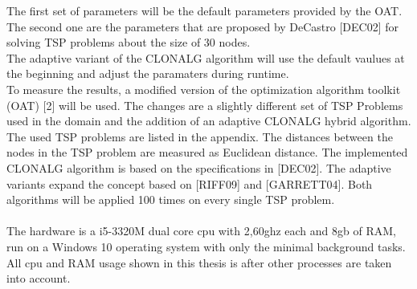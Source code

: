 The first set of parameters will be the default parameters provided by the OAT. The second one are the parameters that are proposed by DeCastro [DEC02] for solving TSP problems about the size of 30 nodes.\\
The adaptive variant of the CLONALG algorithm will use the default vaulues at the beginning and adjust the paramaters during runtime.\\
To measure the results, a modified version of the optimization algorithm toolkit (OAT) [2] will be used. The changes are a slightly different set of TSP Problems used in the domain and the addition of an adaptive CLONALG hybrid algorithm. The used TSP problems are listed in the appendix. The distances between the nodes in the TSP problem are measured as Euclidean distance. The implemented CLONALG algorithm is based on the specifications in [DEC02]. The adaptive variants expand the concept based on [RIFF09] and [GARRETT04].
Both algorithms will be applied 100 times on every single TSP problem.\\\\
The hardware is a i5-3320M dual core cpu with 2,60ghz each and 8gb of RAM, run on a Windows 10 operating system with only the minimal background tasks. All cpu and RAM usage shown in this thesis is after other processes are taken into account.
